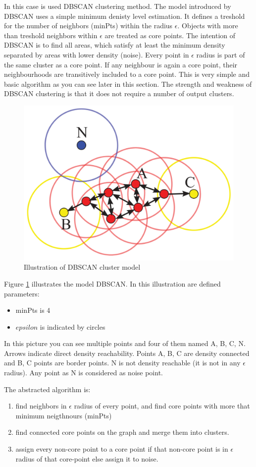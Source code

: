	In this case is used DBSCAN clustering method\cite{Schubert:2017:DRR:3129336.3068335}.
	The model introduced by DBSCAN uses a simple minimum denisty level estimation.
	It defines a treshold for the number of neighbors (minPts) within the radius $\epsilon$.
	Objects with more than treshold neighbors within $\epsilon$ are treated as core points.
	The intention of DBSCAN is to find all areas, which satisfy at least the minimum density separated by areas with lower density (noise).
	Every point in $\epsilon$ radius is part of the same cluster as a core point.
	If any neighbour is again a core point, their neighbourhoods are transitively included to a core point.
	This is very simple and basic algorithm as you can see later in this section.
	The strength and weakness of DBSCAN clustering is that it does not require a number of output clusters.

	\begin{figure}[h]
		\centering
		\includegraphics[width=0.5\linewidth]{obrazky-figures/dbscan}
		\caption{Illustration of DBSCAN cluster model}
		\label{dbscan_ilustration}
	\end{figure}

	Figure \ref{dbscan_ilustration} illustrates the model DBSCAN.
	In this illustration are defined parameters:
	\begin{itemize}
			\item minPts is 4
			\item $epsilon$ is indicated by circles
	\end{itemize}

	In this picture you can see multiple points and four of them named A, B, C, N.
	Arrows indicate direct density reachability. Points A, B, C are density connected and B, C points are border points.
	N is not density reachable (it is not in any $\epsilon$ radius). Any point as N is considered as noise point.

	The abstracted algorithm is:\nopagebreak
	\begin{enumerate}
			\item find neighbors in $\epsilon$ radius of every point, and find core points with more that minimum neigthnours (minPts)
			\item find connected core points on the graph and merge them into clusters.
			\item assign every non-core point to a core point if that non-core point is in $\epsilon$ radius of that core-point else assign it to noise.
	\end{enumerate}

